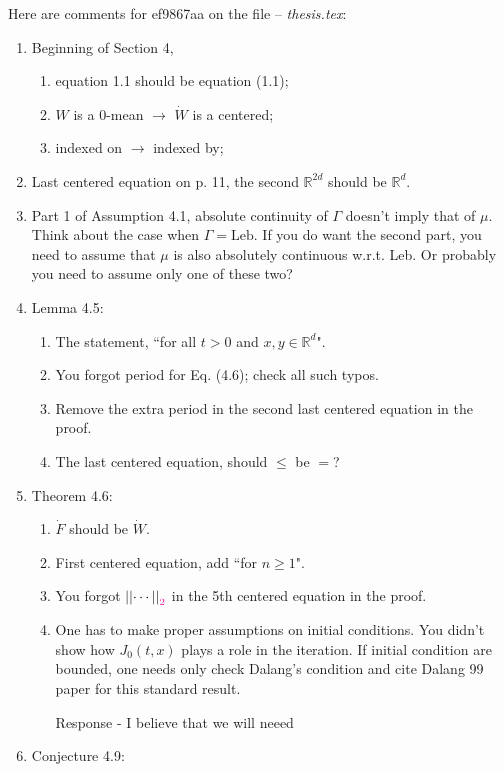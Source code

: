 \documentclass[a4paper,10pt]{article}
\def\R{\mathbb{R}}
\newcommand{\Norm}[1]{\left|\left|  #1   \right|\right|}
\begin{document}
Here are comments for ef9867aa on the file -- {\it thesis.tex}:

\begin{enumerate}
  \item Beginning of Section 4,
    \begin{enumerate}
      \item equation 1.1 should be equation (1.1);
      \item $W$ is a 0-mean $\to$ $\dot{W}$ is a centered;
      \item indexed on $\to$ indexed by;
    \end{enumerate}
  \item Last centered equation on p. 11, the second $\R^{2d}$ should be $\R^d$.
  \item Part 1 of Assumption 4.1, absolute continuity of $\Gamma$ doesn't imply that of $\mu$. Think about the case when
    $\Gamma=\text{Leb.}$ If you do want the second part, you need to assume that $\mu$ is also absolutely continuous
    w.r.t. Leb. Or probably you need to assume only one of these two?
  \item Lemma 4.5:
    \begin{enumerate}
      \item The statement, ``for all $t>0$ and $x,y\in\R^d$".
      \item You forgot period for Eq. (4.6); check all such typos.
      \item Remove the extra period in the second last centered equation in the proof.
      \item The last centered equation, should $\le$ be $=$?
    \end{enumerate}
  \item Theorem 4.6:
    \begin{enumerate}
      \item $\dot{F}$ should be $\dot{W}$.
      \item First centered equation, add ``for $n\ge 1$".
      \item You forgot $\Norm{\cdots}_{\textcolor{magenta}{2}}$ in the 5th centered equation in the proof.
      \item One has to make proper assumptions on initial conditions. You didn't show how $ J_0(t,x)$ plays a role in
        the iteration. If initial condition are bounded, one needs only check Dalang's condition and cite Dalang 99
        paper for this standard result.
        
       Response - I believe that we will neeed 
    \end{enumerate}
      \item Conjecture 4.9:
      

\end{enumerate}
\end{document}

